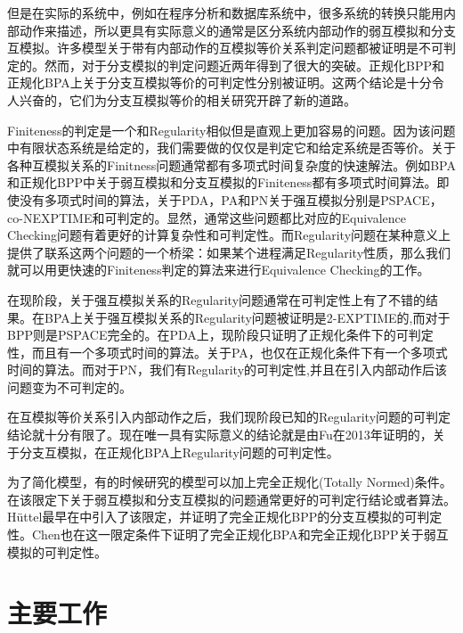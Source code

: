 但是在实际的系统中，例如在程序分析和数据库系统中，很多系统的转换只能用内部动作来描述，所以更具有实际意义的通常是区分系统内部动作的弱互模拟和分支互模拟。许多模型关于带有内部动作的互模拟等价关系判定问题都被证明是不可判定的\cite{Jancar2008}。然而，对于分支模拟的判定问题近两年得到了很大的突破。正规化BPP和正规化BPA上关于分支互模拟等价的可判定性分别被证明\cite{CzerwiAski2011,Fu2013}。这两个结论是十分令人兴奋的，它们为分支互模拟等价的相关研究开辟了新的道路。

Finiteness的判定是一个和Regularity相似但是直观上更加容易的问题。因为该问题中有限状态系统是给定的，我们需要做的仅仅是判定它和给定系统是否等价。关于各种互模拟关系的Finitness问题通常都有多项式时间复杂度的快速解法。例如BPA和正规化BPP中关于弱互模拟和分支互模拟的Finiteness都有多项式时间算法\cite{Kucera2002,Fu2009}。即使没有多项式时间的算法，关于PDA，PA和PN关于强互模拟分别是PSPACE\cite{Kucera2002a}，co-NEXPTIME\cite{Goller2011}和可判定的\cite{Jancar1995a}。显然，通常这些问题都比对应的Equivalence Checking问题有着更好的计算复杂性和可判定性。而Regularity问题在某种意义上提供了联系这两个问题的一个桥梁：如果某个进程满足Regularity性质，那么我们就可以用更快速的Finiteness判定的算法来进行Equivalence Checking的工作。

在现阶段，关于强互模拟关系的Regularity问题通常在可判定性上有了不错的结果。在BPA上关于强互模拟关系的Regularity问题被证明是2-EXPTIME的\cite{Burkart1995,Burkart1996},而对于BPP则是PSPACE完全的\cite{Kot2005a}。在PDA上，现阶段只证明了正规化条件下的可判定性，而且有一个多项式时间的算法\cite{Esparza2000}。关于PA，也仅在正规化条件下有一个多项式时间的算法\cite{Kucera1996}。而对于PN，我们有Regularity的可判定性,并且在引入内部动作后该问题变为不可判定的\cite{Jancar1995a}。

在互模拟等价关系引入内部动作之后，我们现阶段已知的Regularity问题的可判定结论就十分有限了。现在唯一具有实际意义的结论就是由Fu在2013年证明的，关于分支互模拟，在正规化BPA上Regularity问题的可判定性\cite{Fu2013}。

为了简化模型，有的时候研究的模型可以加上完全正规化(Totally Normed)条件。在该限定下关于弱互模拟和分支互模拟的问题通常更好的可判定行结论或者算法。H\"{u}ttel最早在\cite{Huttel1992}中引入了该限定，并证明了完全正规化BPP的分支互模拟的可判定性。Chen也在这一限定条件下证明了完全正规化BPA和完全正规化BPP关于弱互模拟的可判定性\cite{Chen2008a,Chen2008}。

\section{主要工作}
\label{sec:contribution}

